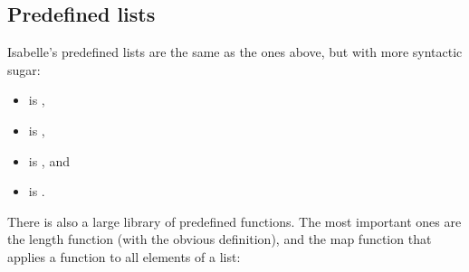 \begin{isabellebody}
\begin{isamarkuptext}
\subsection{Predefined lists}
\label{sec:predeflists}

Isabelle's predefined lists are the same as the ones above, but with
more syntactic sugar:
\begin{itemize}
\item {} is ,
\item {} is ,
\item {} is , and
\item {} is .
\end{itemize}
There is also a large library of predefined functions.
The most important ones are the length function
 (with the obvious definition),
and the map function that applies a function to all elements of a list:
\begin{isabelle}
   \\
\\

\end{isabelle}
\end{isamarkuptext}
\end{isabellebody}
